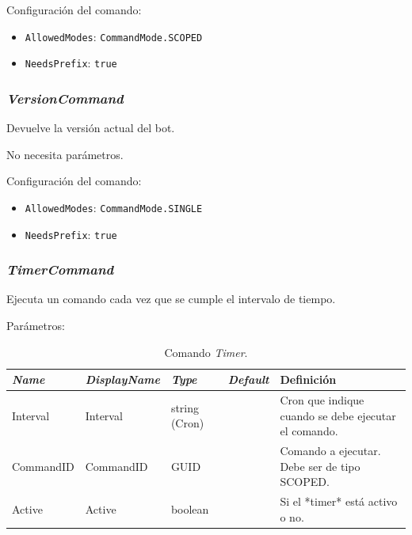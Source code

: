 Configuración del comando:

\begin{itemize}
	\item \verb|AllowedModes|: \verb|CommandMode.SCOPED|
	\item \verb|NeedsPrefix|: \verb|true|
\end{itemize}


\subsubsection{\textit{VersionCommand}}

Devuelve la versión actual del bot.

No necesita parámetros.

Configuración del comando:

\begin{itemize}
	\item \verb|AllowedModes|: \verb|CommandMode.SINGLE|
	\item \verb|NeedsPrefix|: \verb|true|
\end{itemize}

\subsubsection{\textit{TimerCommand}}
Ejecuta un comando cada vez que se cumple el intervalo de tiempo.

Parámetros:

\begin{table}[H]
    \centering
    \def\arraystretch{1.25}
    \begin{adjustbox}{max width=\textwidth}
    \begin{tabularx}{\textwidth}{|l|l|l|l|L|}
    \hline
        \textbf{\textit{Name}} & \textbf{\textit{DisplayName}} & \textbf{\textit{Type}} & \textbf{\textit{Default}} & \textbf{Definición} \\ \hline
    \hline
        Interval & Interval & string (Cron) & ~ & Cron que indique cuando se debe ejecutar el comando. \\ \hline
        CommandID & CommandID & GUID & ~ & Comando a ejecutar. Debe ser de tipo SCOPED. \\ \hline
        Active & Active & boolean & ~ & Si el *timer* está activo o no. \\ \hline
    \end{tabularx}
    \end{adjustbox}
    \caption{Comando \textit{Timer}.}
\end{table}

